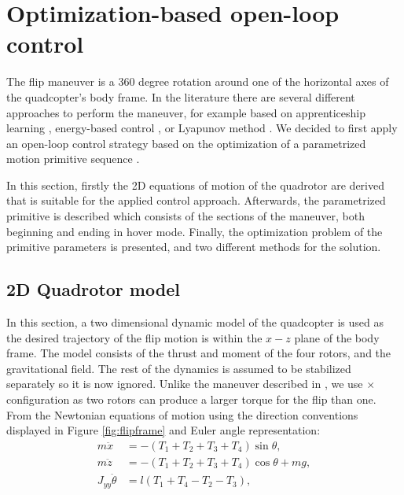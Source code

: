 \section{Optimization-based open-loop control}\label{sec:flip}
The flip maneuver is a 360 degree rotation around one of the horizontal axes of the quadcopter's body frame. In the literature there are several different approaches to perform the maneuver, for example based on apprenticeship learning \cite{abbeel2010}, energy-based control \cite{energy-quaternion}, or Lyapunov method \cite{lyapunov-flip}. We decided to first apply an  open-loop control strategy based on the optimization of a parametrized motion primitive sequence \cite{LSICRA2010}.

In this section, firstly the 2D equations of motion of the quadrotor are derived that is suitable for the applied control approach. Afterwards, the parametrized primitive is described which consists of the sections of the maneuver, both beginning and ending in hover mode. Finally, the optimization problem of the primitive parameters is presented, and two different methods for the solution. 

\subsection{2D Quadrotor model}

In this section, a two dimensional dynamic model of the quadcopter is used as the desired trajectory of the flip motion is within the $x-z$ plane of the body frame. The model consists of the thrust and moment of the four rotors, and the gravitational field. The rest of the dynamics is assumed to be stabilized separately so it is now ignored. Unlike the maneuver described in \cite{LSICRA2010}, we use $\times$ configuration as two rotors can produce a larger torque for the flip than one. From the Newtonian equations of motion using the direction conventions displayed in Figure \ref{fig:flipframe} and Euler angle representation:
\begin{align}
m\ddot{x}&=-(T_1 + T_2 + T_3 + T_4)\sin\theta,\\
m\ddot{z}&=-(T_1 + T_2 +T_3 + T_4) \cos\theta+mg,\\
J_{yy}\ddot{\theta} &= l(T_1+T_4-T_2-T_3),\label{eq:opinp1}
\end{align}

